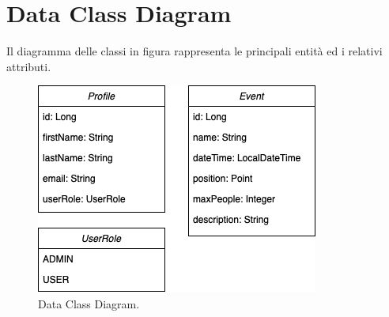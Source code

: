 \section{Data Class Diagram}
Il diagramma delle classi in figura rappresenta le principali entità ed i relativi attributi.
\begin{figure}[h!]
	\centering
	\includegraphics[width=0.8\linewidth]{Iterazione 1/diagrammi/classdiagram.png}
	\caption{Data Class Diagram.}
	\label{fig:DataClassDiagram}
\end{figure}